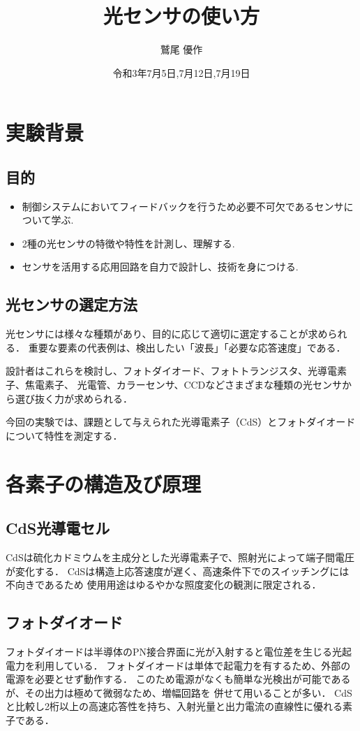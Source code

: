 \documentclass[titlepage]{jarticle}
\title{光センサの使い方}
\author{鷲尾 優作}
\date{令和3年7月5日,7月12日,7月19日}
\begin{document}
\maketitle

\tableofcontents
\newpage

\section{実験背景}
\subsection{目的}
\begin{itemize}
    \item 制御システムにおいてフィードバックを行うため必要不可欠であるセンサについて学ぶ.
    \item 2種の光センサの特徴や特性を計測し、理解する.
    \item センサを活用する応用回路を自力で設計し、技術を身につける.
\end{itemize}

\subsection{光センサの選定方法}
光センサには様々な種類があり、目的に応じて適切に選定することが求められる．
重要な要素の代表例は、検出したい「波長」「必要な応答速度」である．

設計者はこれらを検討し、フォトダイオード、フォトトランジスタ、光導電素子、焦電素子、
光電管、カラーセンサ、CCDなどさまざまな種類の光センサから選び抜く力が求められる．

今回の実験では、課題として与えられた光導電素子（CdS）とフォトダイオードについて特性を測定する．

\section{各素子の構造及び原理}
\subsection{CdS光導電セル}
CdSは硫化カドミウムを主成分とした光導電素子で、照射光によって端子間電圧が変化する．
CdSは構造上応答速度が遅く、高速条件下でのスイッチングには不向きであるため
使用用途はゆるやかな照度変化の観測に限定される．
\subsection{フォトダイオード}
フォトダイオードは半導体のPN接合界面に光が入射すると電位差を生じる光起電力を利用している．
フォトダイオードは単体で起電力を有するため、外部の電源を必要とせず動作する．
このため電源がなくも簡単な光検出が可能であるが、その出力は極めて微弱なため、増幅回路を
併せて用いることが多い．
CdSと比較し2桁以上の高速応答性を持ち、入射光量と出力電流の直線性に優れる素子である．
\end{document}
